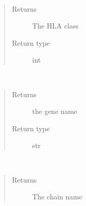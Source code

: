 \documentclass[letterpaper,10pt,english]{sphinxmanual}
\begin{document}
\begin{fulllineitems}
\begin{fulllineitems}
\begin{quote}
\begin{description}
\end{description}\end{quote}

\end{fulllineitems}


\begin{fulllineitems}
\label{\detokenize{IPTK.Classes:IPTK.Classes.HLAChain.HLAChain.get_class}}~\begin{quote}\begin{description}
\item[{Returns}] \leavevmode
The HLA class

\item[{Return type}] \leavevmode
int

\end{description}\end{quote}

\end{fulllineitems}


\begin{fulllineitems}
\label{\detokenize{IPTK.Classes:IPTK.Classes.HLAChain.HLAChain.get_gene}}~\begin{quote}\begin{description}
\item[{Returns}] \leavevmode
the gene name

\item[{Return type}] \leavevmode
str

\end{description}\end{quote}

\end{fulllineitems}


\begin{fulllineitems}
\label{\detokenize{IPTK.Classes:IPTK.Classes.HLAChain.HLAChain.get_name}}~\begin{quote}\begin{description}
\item[{Returns}] \leavevmode
The chain name


\end{description}
\end{quote}
\end{fulllineitems}
\end{fulllineitems}
\end{document}
